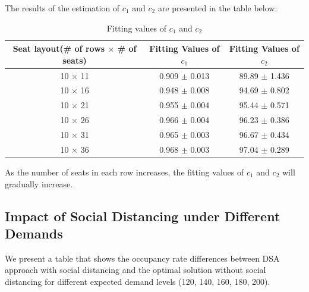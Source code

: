 The results of the estimation of $c_1$ and $c_2$ are presented in the table below:

\begin{table}[ht]
  \centering
  \caption{Fitting values of $c_1$ and $c_2$}
  \begin{tabular}{|c|c|c|}
  \hline
   Seat layout(\# of rows $\times$ \# of seats) & Fitting Values of $c_1$ & Fitting Values of $c_2$  \\
  \hline
   10 $\times$ 11 & 0.909 $\pm$ 0.013  & 89.89 $\pm$ 1.436 \\
   10 $\times$ 16 & 0.948 $\pm$ 0.008  & 94.69 $\pm$ 0.802 \\
   10 $\times$ 21 & 0.955 $\pm$ 0.004 & 95.44 $\pm$ 0.571 \\
   10 $\times$ 26 & 0.966 $\pm$ 0.004 & 96.23 $\pm$ 0.386 \\
   10 $\times$ 31 & 0.965 $\pm$ 0.003 & 96.67 $\pm$ 0.434 \\
   10 $\times$ 36 & 0.968 $\pm$ 0.003 & 97.04 $\pm$ 0.289 \\
   \hline
  \end{tabular}
\end{table}

As the number of seats in each row increases, the fitting values of $c_1$ and $c_2$ will gradually increase.

\subsection{Impact of Social Distancing under Different Demands}
We present a table that shows the occupancy rate differences between DSA approach with social distancing and the optimal solution without social distancing for different expected demand levels (120, 140, 160, 180, 200).

